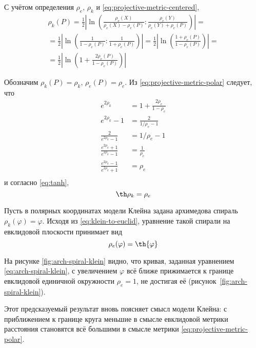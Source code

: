 \documentclass{article}
\numberwithin{equation}{section}
\renewcommand{\phi}{\varphi}
\providecommand{\abs}[1]{\left \lvert{#1}\right \rvert}
\begin{document}


С учётом определения $\rho_e,\,\rho_k$ и
\eqref{eq:projective-metric-centered},
\begin{multline}\label{eq:projective-metric-polar}
  \rho_k(P) =
  \frac{1}{2}\abs{\ln\left(\frac{\rho_e(X)}{\rho_e(X)-\rho_e(P)}:\frac{\rho_e(Y)}{\rho_e(Y)+\rho_e(P)}\right)}  = \\
  =\frac{1}{2}\abs{\ln\left(\frac{1}{1-\rho_e(P)}:\frac{1}{1+\rho_e(P)}\right)} =
  \frac{1}{2}\abs{\ln\left(\frac{1+\rho_e(P)}{1-\rho_e(P)}\right)} =\\
  = \frac{1}{2}\abs{\ln\left(1+\frac{2\rho_e(P)}{1-\rho_e(P)}\right)}
\end{multline}

Обозначим $\rho_k(P) = \rho_k$, $\rho_e(P) = \rho_e$. Из
\eqref{eq:projective-metric-polar} следует, что
\begin{align*}
  e^{2\rho_k} &= 1+\frac{2\rho_e}{1-\rho_e} \\
  e^{2\rho_k}-1 &= \frac{2}{1/\rho_e-1} \\
  \frac{2}{e^{2\rho_k}-1} &=1/\rho_e-1 \\
  \frac{e^{2\rho_k}+1}{e^{2\rho_k}-1} &= \frac{1}{\rho_e} \\
  \frac{e^{2\rho_k}-1}{e^{2\rho_k}+1} &= \rho_e \\
\end{align*}
и согласно \eqref{eq:tanh},
\begin{equation}\label{eq:klein-to-euclid}
  \th \rho_k = \rho_e
\end{equation}

Пусть в полярных координатах модели Клейна задана архимедова спираль
$\rho_k(\phi) = \phi$. Исходя из \eqref{eq:klein-to-euclid}, уравнение
такой спирали на евклидовой плоскости принимает вид
\begin{equation}\label{eq:arch-spiral-klein}
  \rho_e(\phi) = \th{\phi}
\end{equation}



На рисунке \ref{fig:arch-spiral-klein} видно, что кривая, заданная
уравнением \eqref{eq:arch-spiral-klein}, с увеличением $\phi$ всё
ближе прижимается к границе евклидовой единичной окружности
$\rho_e=1$, не достигая её (рисунок \ref{fig:arch-spiral-klein}).

Этот предсказуемый результат вновь поясняет смысл модели Клейна: с
приближением к границе круга меньшие в смысле евклидовой метрики
расстояния становятся всё большими в смысле метрики
\eqref{eq:projective-metric-polar}.
\end{document}
